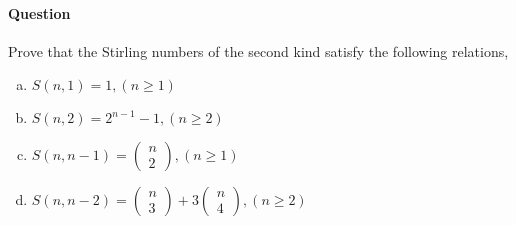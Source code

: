 \documentclass[UTF8]{article}
\begin{document}
\paragraph{Question}
Prove that the Stirling numbers of the second kind satisfy
the following relations,
\begin{enumerate}[(a)]
    \item $ S(n , 1) = 1 , (n \geq 1)$
    \item $ S(n , 2) = 2^{n - 1} - 1, (n \geq 2) $
    \item $ S(n , n - 1) = \begin{pmatrix} n \\ 2 \end{pmatrix}, (n \geq 1) $
    \item $ S(n , n - 2) = \begin{pmatrix} n \\ 3 \end{pmatrix} + 3 \begin{pmatrix} n \\ 4 \end{pmatrix}, (n \geq 2) $
\end{enumerate}
\end{document}
